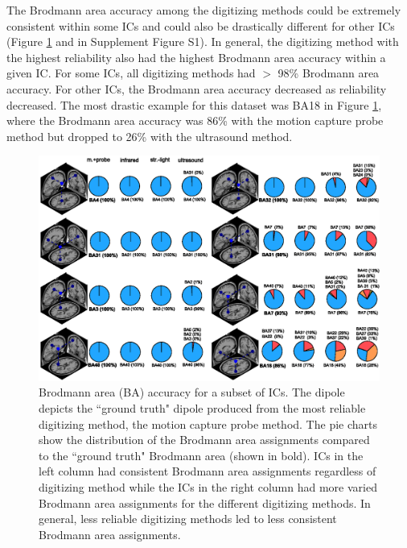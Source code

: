\documentclass[../thesis_seyed.tex]{subfiles}
\begin{document}
The Brodmann area accuracy among the digitizing methods could be extremely consistent within some ICs and could also be drastically different for other ICs (Figure \ref{fig:r6} and in Supplement Figure S1). In general, the digitizing method with the highest reliability also had the highest Brodmann area accuracy within a given IC. For some ICs, all digitizing methods had $>$ 98\% Brodmann area accuracy. For other ICs, the Brodmann area accuracy decreased as reliability decreased. The most drastic example for this dataset was BA18 in Figure \ref{fig:r6}, where the Brodmann area accuracy was 86\% with the motion capture probe method but dropped to 26\% with the ultrasound method.

\begin{figure}[bt!]
    \centering
    \includegraphics[width=\linewidth]{../img/result6.eps}
    \caption{Brodmann area (BA) accuracy for a subset of ICs. The dipole depicts the ``ground truth" dipole produced from the most reliable digitizing method, the motion capture probe method. The pie charts show the distribution of the Brodmann area assignments compared to the ``ground truth" Brodmann area (shown in bold). ICs in the left column had consistent Brodmann area assignments regardless of digitizing method while the ICs in the right column had more varied Brodmann area assignments for the different digitizing methods. In general, less reliable digitizing methods led to less consistent Brodmann area assignments.}
    \label{fig:r6}
\end{figure}
\end{document}
